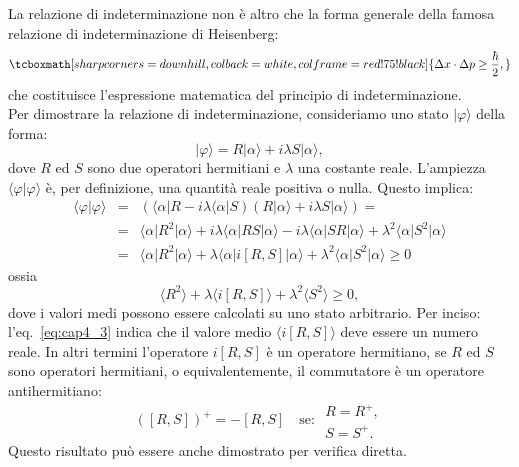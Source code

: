 \documentclass[a4paper,12pt,oneside]{book}
\begin{document}
La relazione di indeterminazione non è altro che la forma generale della famosa relazione di indeterminazione di Heisenberg:
	\begin{equation}
		\tcboxmath[sharp corners=downhill ,colback=white,colframe=red!75!black]{
		\Delta x \cdot \Delta p \geq \frac{\hbar}{2},
		}
	\end{equation}
che costituisce l'espressione matematica del principio di indeterminazione.\\
Per dimostrare la relazione di indeterminazione, consideriamo uno stato $\vert \varphi \rangle$ della forma:
	\begin{equation}
		\vert \varphi \rangle = R\vert \alpha \rangle +i \lambda S \vert \alpha \rangle ,
	\end{equation}
dove $R$ ed $S$ sono due operatori hermitiani e $\lambda $ una costante reale. L'ampiezza $\langle \varphi \vert \varphi \rangle$ è, per definizione, una quantità reale positiva o nulla. Questo implica:
	\begin{eqnarray}
		\langle \varphi \vert \varphi \rangle &=&\left( \langle \alpha \vert R -i \lambda \langle \alpha \vert S \right) \left( R\vert \alpha \rangle +i \lambda S \vert \alpha \rangle  \right) = \nonumber \\
		&=&\langle \alpha \vert R^2 \vert \alpha \rangle + i\lambda \langle \alpha \vert RS \vert \alpha \rangle - i\lambda \langle \alpha \vert SR \vert \alpha \rangle + \lambda ^2 \langle \alpha \vert S^2 \vert \alpha \rangle \nonumber \\
		&=& \langle \alpha \vert R^2 \vert \alpha \rangle + \lambda \langle \alpha \vert i\left[ R,S\right] \vert \alpha \rangle + \lambda ^2 \langle \alpha \vert S^2 \vert \alpha \rangle \geq 0 
\end{eqnarray}
ossia
	\begin{equation}
		\label{eq:cap4_3}
		\langle  R^2  \rangle + \lambda \langle i\left[ R,S \right] \rangle + \lambda ^2 \langle S^2 \rangle \geq 0,
	\end{equation}
dove i valori medi possono essere calcolati su uno stato arbitrario. 
Per inciso: l'eq.~\eqref{eq:cap4_3} indica che il valore medio $\langle i\left[ R,S \right] \rangle$ deve essere un numero reale. In altri termini l'operatore $i\left[R,S	\right]$ è un operatore hermitiano, se $R$ ed $S$ sono operatori hermitiani, o equivalentemente, il commutatore è un operatore antihermitiano:
	\begin{equation}
		\left( \left[R,S \right] \right) ^{+} = - \left[R,S \right] \quad \textrm{se: } \begin{array}{c}
		R=R^{+},\\
		S=S^{+}.
		\end{array}
	\end{equation}
Questo risultato può essere anche dimostrato per verifica diretta.\\ 
\end{document}

